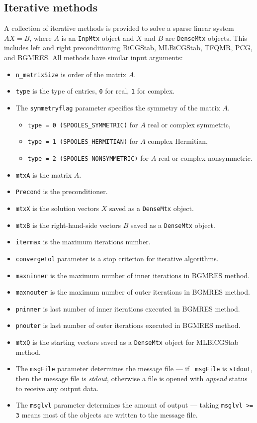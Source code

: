 \subsection{Iterative methods}
A collection of iterative methods is provided to solve a sparse
linear system $AX=B$, where $A$ is an {\tt InpMtx} object and
$X$ and $B$ are {\tt DenseMtx} objects.  
This includes left and right preconditioning BiCGStab,
MLBiCGStab, TFQMR, PCG, and BGMRES.
All methods have similar input arguments:
\par
\begin{itemize}
\item
{\tt n\_matrixSize} is order of the matrix $A$.
\item
{\tt type} is the type of entries, {\tt 0} for real, {\tt 1} for complex.
\item
The {\tt symmetryflag} parameter specifies the symmetry of the matrix $A$.
\begin{itemize}
\item
{\tt type = 0 (SPOOLES\_SYMMETRIC)} for $A$ real or complex symmetric,
\item
{\tt type = 1 (SPOOLES\_HERMITIAN)} for $A$ complex Hermitian,
\item
{\tt type = 2 (SPOOLES\_NONSYMMETRIC)} for $A$ real or complex nonsymmetric.
\end{itemize}
\item
{\tt mtxA} is the matrix $A$.
\item
{\tt Precond} is the preconditioner.
\item
{\tt mtxX} is the solution vectors $X$ saved as a {\tt DenseMtx} object.
\item
{\tt mtxB} is the right-hand-side vectors $B$ saved as a {\tt DenseMtx} object.
\item
{\tt itermax} is the maximum iterations number. 
\item
{\tt convergetol}  parameter is a stop criterion for iterative algorithms.
\item
{\tt maxninner} is the maximum number of inner iterations in BGMRES method.
\item
{\tt maxnouter} is the maximum number of outer iterations in BGMRES method.
\item
{\tt pninner} is last number of inner iterations executed in BGMRES method.
\item
{\tt pnouter} is last number of outer iterations executed in BGMRES method.
\item
{\tt mtxQ} is the starting vectors saved as a {\tt DenseMtx} object
  for MLBiCGStab method.
\item
The {\tt msgFile} parameter determines the message file --- if {\tt
msgFile} is {\tt stdout}, then the message file is {\it stdout},
otherwise a file is opened with {\it append} status to receive any
output data.
\item
The {\tt msglvl} parameter determines the amount of output ---
taking {\tt msglvl >= 3} means most of the objects are written
to the message file.

\end{itemize}


